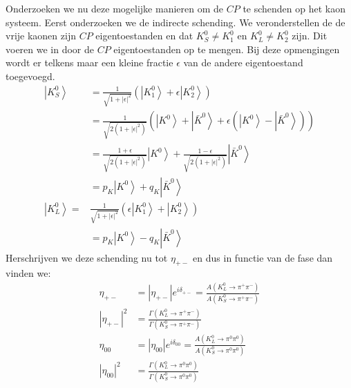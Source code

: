 \documentclass[../main.tex]{subfiles}
\begin{document}
Onderzoeken we nu deze mogelijke manieren om de $CP$ te schenden op het kaon systeem. Eerst onderzoeken we de indirecte schending. We veronderstellen de de vrije kaonen zijn $CP$ eigentoestanden en dat $K_S^0\neq K_1^0$ en $K_L^0\neq K_2^0$ zijn. Dit voeren we in door de $CP$ eigentoestanden op te mengen. Bij deze opmengingen wordt er telkens maar een kleine fractie $\epsilon$ van de andere eigentoestand toegevoegd.
\begin{equation}
    \begin{aligned}
        \label{eq:kaon_indirecte_cp_violation_1}
        \left| K_{S}^{0}\right>&=\frac{1}{\sqrt{1+|\epsilon|^{2}}}\left(\left|K_{1}^{0}\right>+\epsilon\left| K_{2}^{0} \right>\right) \\
                               &=\frac{1}{\sqrt{2\left(1+|\epsilon|^{2}\right)}}\left(\left|K^{0}\right>+\left| \bar{K}^{0}\right>+\epsilon\left(\left|K^{0}\right>-\left| \bar{K}^{0}\right>\right)\right) \\
                               &=\frac{1+\epsilon}{\sqrt{2\left(1+|\epsilon|^{2}\right)}}\left|K^{0}\right>+\frac{1-\epsilon}{\sqrt{2\left(1+|\epsilon|^{2}\right)}}\left| \bar{K}^{0}\right>\\
                               &=p_{K}\left|K^{0}\right>+q_{K}\left| \bar{K}^{0}\right>\\
        \left| K_{L}^{0}\right>=& \frac{1}{\sqrt{1+|\epsilon|^{2}}}\left(\epsilon\left|K_{1}^{0}\right>+\left| K_{2}^{0}\right>\right) \\
                                &=p_{K}\left|K^{0}\right>-q_{K}\left| \bar{K}^{0}\right>
    \end{aligned}
\end{equation}
Herschrijven we deze schending nu tot $\eta_{+-}$ en dus in functie van de fase dan vinden we:
\begin{equation}
    \begin{aligned}
        \label{eq:kaon_indirecte_cp_violation_2}
        \eta_{+-} &=\left|\eta_{+-}\right| e^{i \delta_{+-}}=\frac{A\left(K_{L}^{0} \rightarrow \pi^{+} \pi^{-}\right)}{A\left(K_{S}^{0} \rightarrow \pi^{+} \pi^{-}\right)} \\
        \left|\eta_{+-}\right|^{2} &=\frac{\Gamma\left(K_{L}^{0} \rightarrow \pi^{+} \pi^{-}\right)}{\Gamma\left(K_{S}^{0} \rightarrow \pi^{+} \pi^{-}\right)} \\
        \eta_{00} &=\left|\eta_{00}\right| e^{i \delta_{00}}=\frac{A\left(K_{L}^{0} \rightarrow \pi^{0} \pi^{0}\right)}{A\left(K_{S}^{0} \rightarrow \pi^{0} \pi^{0}\right)} \\
        \left|\eta_{00}\right|^{2} &=\frac{\Gamma\left(K_{L}^{0} \rightarrow \pi^{0} \pi^{0}\right)}{\Gamma\left(K_{S}^{0} \rightarrow \pi^{0} \pi^{0}\right)}
    \end{aligned}
\end{equation}
\end{document}
